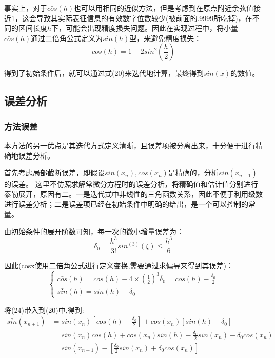 \documentclass[UTF8]{ctexart}
\begin{document}
事实上，对于$\bar{cos}(h)$也可以用相同的近似方法，但是考虑到在原点附近余弦值接近1，这会导致其实际表征信息的有效数字位数较少(被前面的.9999所吃掉)，在不同的区间长度$h$下，可能会出现精度损失问题。因此在实现过程中，将小量$\bar{cos}(h)$通过二倍角公式定义为$sin(h)$型，来避免精度损失：
\begin{equation}
    \bar{cos}(h) = 1-2sin^2(\frac{h}{2})
\end{equation}

得到了初始条件后，就可以通过式(20)来迭代地计算，最终得到$sin(x)$的数值。

\subsection{误差分析}

\subsubsection{方法误差}

本方法的另一优点是其迭代方式定义清晰，且误差项被分离出来，十分便于进行精确地误差分析。

首先考虑局部截断误差，即假设$sin(x_n),cos(x_n)$是精确的，分析$sin(x_{n+1})$的误差。
这里不仿照求解常微分方程时的误差分析，将精确值和估计值分别进行泰勒展开，原因有二。一是迭代式中非线性的三角函数关系，因此不便于利用级数进行误差分析；二是误差项已经在初始条件中明确的给出，是一个可以控制的常量。

由初始条件的展开阶数可知，每一次的微小增量误差为：
\begin{equation}
    \delta_0 = \frac{h^3}{3!}sin^{(3)}(\xi) \leq \frac{h^3}{6}
\end{equation}

因此(cosx使用二倍角公式进行定义变换,需要通过求偏导来得到其误差)：
\begin{equation}
    \begin{cases}
        \bar{cos}(h) = cos(h) - 4\times{(\frac{1}{2})}^3\delta_0 = cos(h) - \frac{\delta_0}{2}\\
        \bar{sin}(h) = sin(h) - \delta_0
    \end{cases}
\end{equation}

将(24)带入到(20)中,得到:
\begin{equation}
    \begin{aligned}
        \bar{sin}(x_{n+1}) &= sin(x_n)[cos(h)-\frac{\delta_0}{2}] + cos(x_n)[sin(h) - \delta_0]\\
        &=sin(x_n)cos(h)+cos(x_n)sin(h) - \frac{\delta_0}{2}sin(x_n)-\delta_0 cos(x_n)\\
        &=sin(x_{n+1}) - [\frac{\delta_0}{2}sin(x_n)+\delta_0 cos(x_n)]\\
    \end{aligned}
\end{equation}
\end{document}
